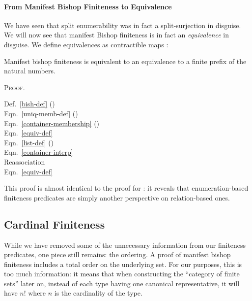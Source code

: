 \paragraph{From Manifest Bishop Finiteness to Equivalence}
We have seen that split enumerability was in fact a split-surjection in
disguise.
We will now see that manifest Bishop finiteness is in fact an \emph{equivalence}
in disguise.
We define equivalences as contractible maps \cite[definition 4.4.1]{hottbook}:
    \begin{paracol}{2}
      \switchcolumn%
    \end{paracol}
\begin{lemma}\label{bishop-equiv}
  Manifest bishop finiteness is equivalent to an equivalence to a finite prefix
  of the natural numbers.
\end{lemma}\noindent%
\textsc{Proof.}

\begin{minipage}[t]{.83\textwidth}\vspace{-1.25\baselineskip}
\end{minipage}
\begin{minipage}[t]{.16\textwidth}
  Def.~\ref{bish-def} ()     \\
  Eqn.~\ref{uniq-memb-def} (\AgdaDatatype{\ensuremath{\in!}})       \\
  Eqn.~\ref{container-membership} (\AgdaDatatype{\ensuremath{\in}}) \\
  Eqn.~\ref{equiv-def} \\
  Eqn.~\ref{list-def} ({}) \\
  Eqn.~\ref{container-interp}  \\
  Reassociation \\
  Eqn.~\ref{equiv-def}
\end{minipage}

This proof is almost identical to the proof for
: it reveals that
enumeration-based finiteness predicates are simply another perspective on
relation-based ones.

\subsection{Cardinal Finiteness}\label{cardinal-finiteness}
While we have removed some of the unnecessary information from our finiteness
predicates, one piece still remains: the ordering.
A proof of manifest bishop finiteness includes a total order on the underlying
set.
For our purposes, this is too much information: it means that when constructing
the ``category of finite sets'' later on, instead of each type having one
canonical representative, it will have $n!$ where $n$ is the cardinality of
the type\footnotemark.

